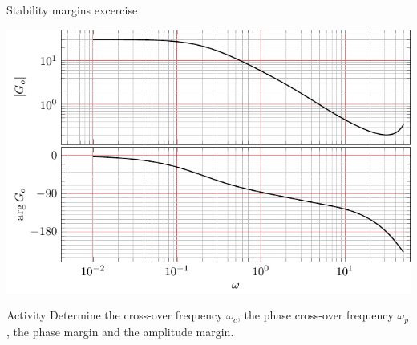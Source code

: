 \documentclass[presentation,aspectratio=169]{beamer}
\begin{document}
\begin{frame}[label={sec:org306d38f}]{Stability margins excercise}
\begin{center}
  \includegraphics[width=.6\linewidth]{../../figures/bode-example-margin2.pdf}
\end{center}

\alert{Activity} Determine the cross-over frequency \(\omega_c\), the phase cross-over frequency \(\omega_p\), the phase margin and the amplitude margin. 
\end{frame}
\end{document}
